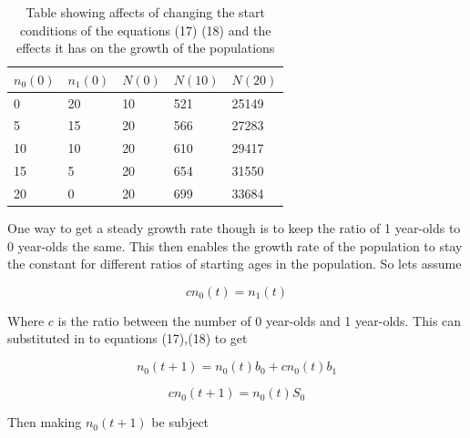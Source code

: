 \documentclass[final]{cmpreport}
\begin{document}
	\begin{table}[h!]
	\centering
	\caption{Table showing affects of changing the start conditions of the equations (17) (18) and the effects it has on the growth of the populations}
	\begin{tabular}{|l|l|l|l|l|}
		\hline 
		$n_0(0) $ & $n_1(0) $ & $N(0) $ & $N(10)$ & $N(20)$ \\
		\hline
		0       & 20                                      & 10                               & 521                               & 25149      \\                  
		5       & 15                                      & 20                               & 566                               & 27283      \\                     
		10   	& 10                                      & 20                               & 610                               & 29417      \\                       
		15  	& 5                                       & 20                               & 654                               & 31550      \\                    
		20      & 0                                       & 20                               & 699                               & 33684      \\     
		\hline                 
	\end{tabular}
	\end{table}
	
	One way to get a steady growth rate though is to keep the ratio of 1 year-olds to 0 year-olds the same. This then enables the growth rate of the population to stay the constant for different ratios of starting ages in the population. So lets assume
	
	\begin{equation}
	 cn_0(t) = n_1(t)
	\end{equation}
	
	Where $c$ is the ratio between the number of 0 year-olds and 1 year-olds. This can substituted in to equations (17),(18) to get
	
	\begin{equation}
	 n_0(t+1) = n_0(t)b_0 + cn_0(t)b_1 
	\end{equation}
	
	\begin{equation}
	cn_0(t+1) = n_0(t)S_0
	\end{equation}
	
	Then making $n_0(t+1)$ be subject
	
\end{document}
